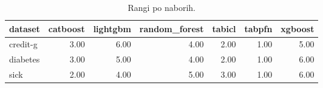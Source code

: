 \begin{table}[htbp]
\centering
\caption{Rangi po naborih.}
\label{tab:ranks}
\begin{tabular}{lrrrrrr}
\hline
dataset & catboost & lightgbm & random\_forest & tabicl & tabpfn & xgboost \\
\hline
credit-g & 3.00 & 6.00 & 4.00 & 2.00 & 1.00 & 5.00 \\
diabetes & 3.00 & 5.00 & 4.00 & 2.00 & 1.00 & 6.00 \\
sick & 2.00 & 4.00 & 5.00 & 3.00 & 1.00 & 6.00 \\
\hline
\end{tabular}
\end{table}
